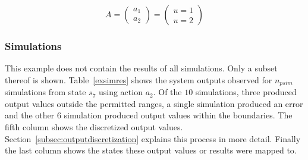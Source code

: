 \[
A = \begin{pmatrix} a_1 \\ a_2 \end{pmatrix}
 = \begin{pmatrix} u = 1 \\ u = 2 \end{pmatrix}
\]

\subsubsection{Simulations}

This example does not contain the results of all simulations. Only a subset thereof is shown. Table~\ref{exsimres} shows the system outputs observed for $n_{psim}$ simulations from state $s_7$ using action $a_2$. Of the $10$ simulations, three produced output values outside the permitted ranges, a single simulation produced an error and the other $6$ simulation produced output values within the boundaries. The fifth column shows the discretized output values. Section~\ref{subsec:outputdiscretization} explains this process in more detail. Finally the last column shows the states these output values or results were mapped to.

